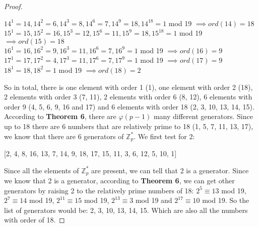 \documentclass[a4paper]{article}
\begin{document}
\begin{proof}
\begin{center}
$14^1 = 14, 14^2 = 6, 14^3 = 8, 14^6 = 7, 14^9 = 18, 14^{18} = 1$ mod 19 $\implies ord(14) = 18$\\
$15^1 = 15, 15^2 = 16, 15^3 = 12, 15^6 = 11, 15^9 = 18, 15^{18} = 1$ mod 19 $\implies ord(15) = 18$\\
$16^1 = 16, 16^2 = 9, 16^3 = 11, 16^6 = 7, 16^9 = 1$ mod 19 $\implies ord(16) = 9$\\
$17^1 = 17, 17^2 = 4, 17^3 = 11, 17^6 = 7, 17^9 = 1$ mod 19 $\implies ord(17) = 9$\\
$18^1 = 18, 18^2 = 1$ mod 19 $\implies ord(18) = 2$\\
\end{center}
So in total, there is one element with order 1 (1), one element with order 2 (18), 2 elements with order 3 (7, 11), 2 elements with order 6 (8, 12), 6 elements with order 9 (4, 5, 6, 9, 16 and 17) and 6 elements with order 18 (2, 3, 10, 13, 14, 15).
According to \textbf{Theorem 6}, there are $\varphi(p - 1)$ many different generators. Since up to 18 there are 6 numbers that are relatively prime to 18 (1, 5, 7, 11, 13, 17), we know that there are 6 generators of $\mathbb{Z}^{*}_{p}$. We first test for 2:
\begin{center}
[2, 4, 8, 16, 13, 7, 14, 9, 18, 17, 15, 11, 3, 6, 12, 5, 10, 1]
\end{center}
 Since all the elements of $\mathbb{Z}^{*}_{p}$ are present, we can tell that 2 is a generator. Since we know that 2 is a generator, according to \textbf{Theorem 6}, we can get other generators by raising 2 to the relatively prime numbers of 18:  $2^{5} \equiv 13$ mod 19, $2^{7} \equiv 14$ mod 19, $2^{11} \equiv 15$ mod 19, $2^{13} \equiv 3$ mod 19 and $2^{17} \equiv 10$ mod 19. So the list of generators would be: 2, 3, 10, 13, 14, 15. Which are also all the numbers with order of 18.
\end{proof}
\end{document}
